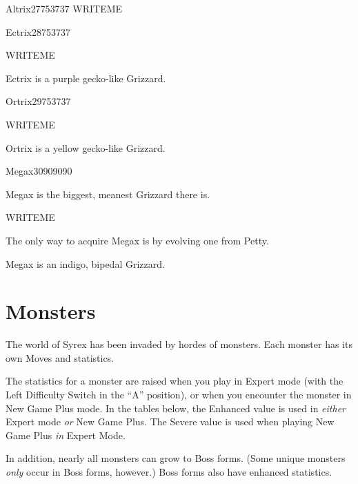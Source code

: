 \documentclass[10pt,twocolumn]{memoir}
\begin{document}
\begin{grizzardpage}{Altrix}{27}{75}{37}{37}{}
  WRITEME
\end{grizzardpage}

\begin{grizzardpage}{Ectrix}{28}{75}{37}{37}{}

WRITEME
  
  Ectrix is a purple gecko-like Grizzard.

\end{grizzardpage}

\begin{grizzardpage}{Ortrix}{29}{75}{37}{37}{}

WRITEME
  
  Ortrix is a yellow gecko-like Grizzard. %

\end{grizzardpage}

\begin{grizzardpage}{Megax}{30}{90}{90}{90}{}

  Megax is the biggest, meanest Grizzard there is.

WRITEME
  
  The only way to acquire Megax is by evolving one from Petty.

  Megax is an indigo, bipedal Grizzard.

\end{grizzardpage}

\chapter{Monsters}\label{ch:Monsters}

The world of Syrex has been  invaded by hordes of monsters. Each monster
has its own Moves and statistics.

The statistics  for a monster  are raised when  you play in  Expert mode
(with the  Left Difficulty Switch  in the  ``A'' position), or  when you
encounter the  monster in New Game  Plus mode. In the  tables below, the
Enhanced value is  used in \emph{either} Expert mode  \emph{or} New Game
Plus. The  Severe value  is used  when playing  New Game  Plus \emph{in}
Expert Mode.



In addition,  nearly all monsters can  grow to Boss forms.  (Some unique
monsters \emph{only} occur in Boss forms, however.) Boss forms also have
enhanced statistics.

\newcommand\twicely[1]{\the\numexpr#1*2\relax}
\newcommand\thricely[1]{\the\numexpr#1*3\relax}
\newcommand\fourxly[1]{\the\numexpr#1*4\relax}
\newcommand\eightxly[1]{\the\numexpr#1*8\relax}
\end{document}
